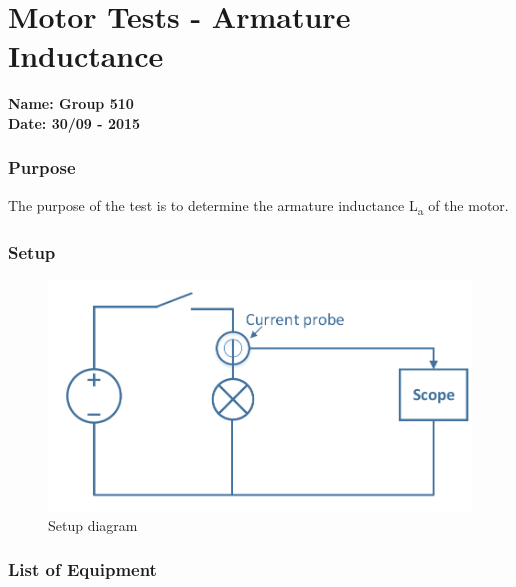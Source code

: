 \pagebreak
\section{Motor Tests - Armature Inductance} \label{app:motorTestArmatureInductance}
\textbf{Name: Group 510}\\
\textbf{Date: 30/09 - 2015}

\subsubsection{Purpose}
The purpose of the test is to determine the armature inductance \si{L_a} of the motor.

\subsubsection{Setup}
\begin{figure}[H]
  \centering
	\includegraphics[scale=0.5]{figures/MotorTest2.pdf}
	\caption{Setup diagram}
\end{figure}\vspace{-5mm}

\subsubsection{List of Equipment}

